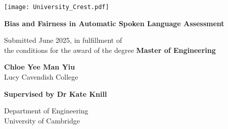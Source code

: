\begin{titlepage}
    \begin{center}
        \vspace*{1.5cm}

        \texttt{[image: University\_Crest.pdf]}\par
        \vspace{1cm}

        {\LARGE \textbf{Bias and Fairness in Automatic Spoken Language Assessment} \par}
        \vspace{1.5cm}

        \onehalfspacing
        Submitted June 2025, in fulfillment of \\
        the conditions for the award of the degree \textbf{Master of Engineering}
        \vspace{1cm}

        \normalsize
        \textbf{Chloe Yee Man Yiu} \\
        Lucy Cavendish College
        \vspace{1cm}

        \textbf{Supervised by Dr Kate Knill}
        \vspace{1cm}

        Department of Engineering \\
        University of Cambridge
    \end{center}
\end{titlepage}
